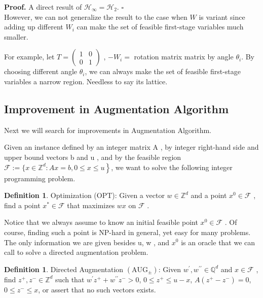 \documentclass{article}
\theoremstyle{plain}
\theoremstyle{definition}
\newtheorem{definition}[theorem]{Definition}
\begin{document}
\textbf{Proof.} A direct result of $\mathcal{H}_{\infty}=\mathcal{H}_{2}$. \hfill $\square$\\

However, we can not generalize the result to the case when $W$ is variant since  adding up different $W_i$ can make the set of feasible first-stage variables much smaller.

For example, let $T = \begin{pmatrix} 1 & 0 \\ 0 & 1\end{pmatrix}$ , $-W_i = $ rotation matrix matrix by angle $\theta_i$. By choosing different angle $\theta_i$, we can always make the set of feasible first-stage variables a narrow region. Needless to say its lattice.

\subsection{Improvement in Augmentation Algorithm}

Next we will search for improvements in Augmentation Algorithm.

Given an instance defined by an integer matrix  A , by integer right-hand side and upper bound vectors  b  and  u , and by the feasible region  $\mathscr{F}:=\{x \in   \left.\mathbb{Z}^{d}: A x=b, 0 \leq x \leq u\right\}$, we want to solve the following integer programming problem.

\begin{definition}
Optimization (OPT):  Given a vector  $w \in \mathbb{Z}^{d}$  and a point  $x^{0} \in \mathscr{F}$ , find a point  $x^{*} \in \mathscr{F}$  that maximizes  $w x$  on  $\mathscr{F}$ .
\end{definition}

Notice that we always assume to know an initial feasible point $ x^{0} \in \mathscr{F}$ . Of course, finding such a point is NP-hard in general, yet easy for many problems. The only information we are given besides  u, w , and $ x^{0}$  is an oracle that we can call to solve a directed augmentation problem.

\begin{definition}
Directed Augmentation  $\left(\mathrm{AUG}_{\pm}\right) $: Given  $w^{\prime}, w^{\prime \prime} \in \mathbb{Q}^{d}$  and  $x \in \mathscr{F}$ , find  $z^{+}, z^{-} \in 
 \mathbb{Z}^{d}$  such that $w^{\prime} z^{+}+w^{\prime \prime} z^{-}>0$, $ 0 \leq z^{+} \leq u-x$,
$A\left(z^{+}-z^{-}\right)=0$, $ 0 \leq z^{-} \leq x$, or assert that no such vectors exists.
\end{definition}
\end{document}
